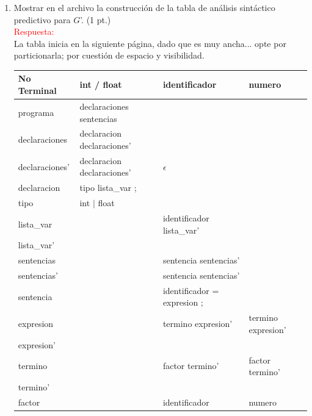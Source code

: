 \documentclass[11pt]{report}
\begin{document}
\begin{enumerate}
    FOLLOW(declaraciones) = $\{$ identificador, if, while $\}$ \\
    FOLLOW(declaraciones') = $\{$ identificador, if, while $\}$ \\
    FOLLOW(declaracion) = $\{$ int, float, identificador, if, while $\}$ \\
    FOLLOW(tipo) = $\{$ identificador $\}$ \\
    FOLLOW(lista\_var) = $\{$ ; $\}$ \\
    FOLLOW(lista\_var') = $\{$ ; $\}$ \\
    FOLLOW(expresion) = $\{$ ;, ), else $\}$ \\
    FOLLOW(expresion') = $\{$ ;, ), else $\}$ \\
    FOLLOW(termino) = $\{$ +, -, ;, ), else $\}$ \\
    FOLLOW(termino') = $\{$ +, -, ;, ), else $\}$ \\
    FOLLOW(factor) = $\{$ *, /, +, -, ;, ), else $\}$
  \item Mostrar en el archivo la construcción de la tabla de análisis sintáctico
  predictivo para $G$'. (1 pt.) \\
    \textcolor{red}{Respuesta:} \\
    La tabla inicia en la siguiente página, dado que es muy
    ancha... opte por particionarla; por cuestión de espacio y visibilidad. \\
  \newpage
  \begin{tabular}{ |l|l|l|l| }
    \hline
    \textbf{No Terminal} & \textbf{int / float} & \textbf{identificador} & \textbf{numero} \\
    \hline
    programa & declaraciones sentencias & & \\
    declaraciones & declaracion declaraciones' & & \\
    declaraciones' & declaracion declaraciones' & $\epsilon$ & \\
    declaracion & tipo lista\_var ; & & \\
    tipo & int $|$ float & & \\
    lista\_var & & identificador lista\_var' & \\
    lista\_var' & & & \\
    sentencias & & sentencia sentencias' & \\
    sentencias' & & sentencia sentencias' & \\
    sentencia & & identificador = expresion ; & \\
    expresion & & termino expresion' & termino expresion' \\
    expresion' & & & \\
    termino & & factor termino' & factor termino' \\
    termino' & & & \\
    factor & & identificador & numero \\
    \hline
  \end{tabular} \\


\end{enumerate}
\end{document}
